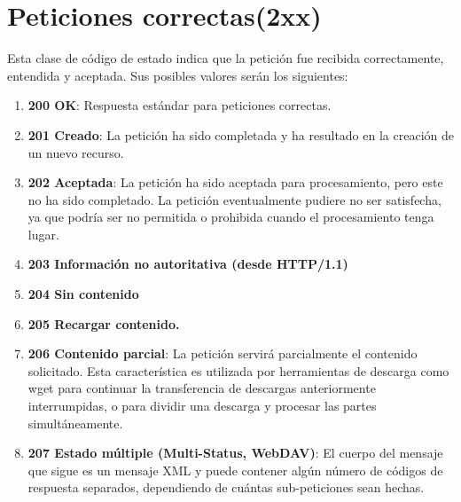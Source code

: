 \section{Peticiones correctas(2xx)}
Esta clase de código de estado indica que la petición fue recibida correctamente, entendida y aceptada. Sus posibles valores serán los siguientes:
\bigskip
\par
\begin{enumerate}
\item \textbf{200 OK}: Respuesta estándar para peticiones correctas.
\item \textbf{201 Creado}: La petición ha sido completada y ha resultado en la creación de un nuevo recurso.
\item \textbf{202 Aceptada}: La petición ha sido aceptada para procesamiento, pero este no ha sido completado. La petición eventualmente pudiere no ser satisfecha, ya que podría ser no permitida o prohibida cuando el procesamiento tenga lugar.
\item \textbf{203 Información no autoritativa (desde HTTP/1.1)}
\item \textbf{204 Sin contenido}
\item \textbf{205 Recargar contenido.}
\item \textbf{206 Contenido parcial}: La petición servirá parcialmente el contenido solicitado. Esta característica es utilizada por herramientas de descarga como wget para continuar la transferencia de descargas anteriormente interrumpidas, o para dividir una descarga y procesar las partes simultáneamente.
\item \textbf{207 Estado múltiple (Multi-Status, WebDAV)}: El cuerpo del mensaje que sigue es un mensaje XML y puede contener algún número de códigos de respuesta separados, dependiendo de cuántas sub-peticiones sean hechas.
\end{enumerate}

